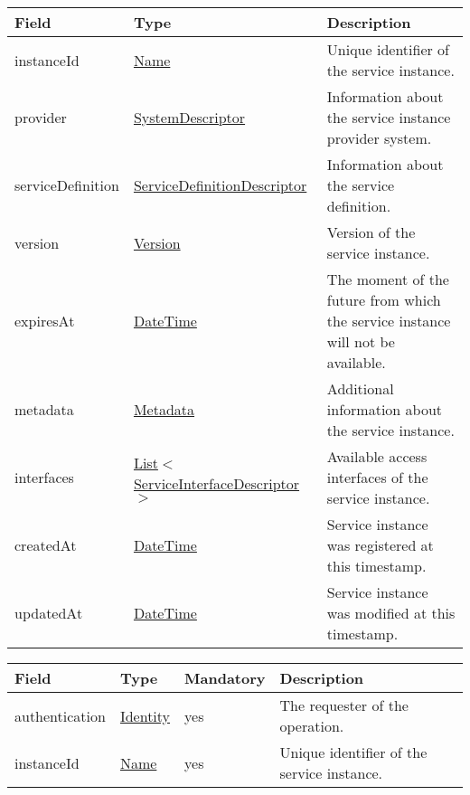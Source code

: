 \documentclass[a4paper]{arrowhead}
\newcommand{\pref}[1]{{\textcolor{ArrowheadGrey}{\hyperref[sec:model:primitives:#1]{#1}}}}
\begin{document}
\label{sec:model:ServiceLookupResult}
 
\begin{table}[ht!]
\begin{tabularx}{\textwidth}{| p{3cm} | p{5cm} | X |} \hline
\rowcolor{gray!33} Field & Type      & Description \\ \hline
instanceId & \pref{Name} & Unique identifier of the service instance. \\ \hline
provider & \hyperref[sec:model:SystemDescriptor]{SystemDescriptor} & Information about the service instance provider system. \\ \hline
serviceDefinition & \hyperref[sec:model:ServiceDefinitionDescriptor]{ServiceDefinitionDescriptor} & Information about the service definition. \\ \hline
version & \pref{Version} & Version of the service instance. \\ \hline
expiresAt & \pref{DateTime} & The moment of the future from which the service ins\-tance will not be available. \\ \hline
metadata & \hyperref[sec:model:Metadata]{Metadata} & Additional information about the service ins\-tance. \\ \hline
interfaces & \pref{List}$<$\hyperref[sec:model:ServiceInterfaceDescriptor]{ServiceInterfaceDescriptor}$>$ & Available access interfaces of the service instance. \\ \hline
createdAt & \pref{DateTime} & Service instance was registered at this timestamp. \\ \hline
updatedAt & \pref{DateTime} & Service instance was modified at this timestamp. \\ \hline
\end{tabularx}
\end{table}

\clearpage

 \label{sec:model:ServiceRevokeRequest}
 
\begin{table}[ht!]
\begin{tabularx}{\textwidth}{| p{3cm} | p{3cm} | p{2cm} | X |} \hline
\rowcolor{gray!33} Field & Type & Mandatory & Description \\ \hline
authentication & \hyperref[sec:model:Identity]{Identity} & yes & The requester of the operation. \\ \hline
instanceId & \pref{Name} & yes & Unique identifier of the service instance. \\ \hline
\end{tabularx}
\end{table}
\end{document}
